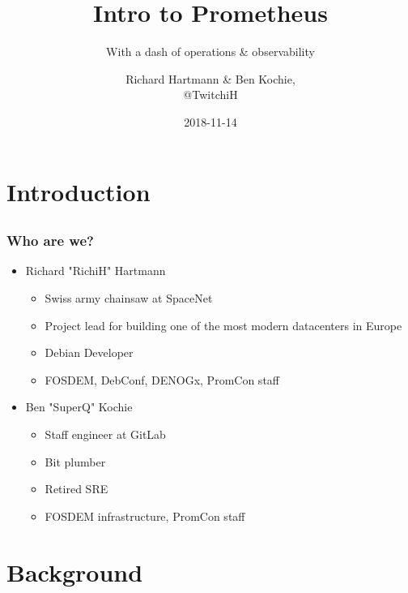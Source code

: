 \documentclass[t]{beamer}
\title{Intro to Prometheus}
\subtitle{With a dash of operations \& observability}
\author{Richard Hartmann \& Ben Kochie,\\
@TwitchiH}
\date{2018-11-14}
\begin{document}
\section{Introduction}

\subsection{}

\begin{frame}
	\titlepage
\end{frame}

\begin{frame}
	\frametitle{Who are we?}
	\begin{itemize}
		\item Richard "RichiH" Hartmann
		\begin{itemize}
			\item Swiss army chainsaw at SpaceNet
			\item Project lead for building one of the most modern datacenters in Europe
			\item Debian Developer
			\item FOSDEM, DebConf, DENOGx, PromCon staff
		\end{itemize}
		\item Ben "SuperQ" Kochie
		\begin{itemize}
			\item Staff engineer at GitLab
			\item Bit plumber
			\item Retired SRE
			\item FOSDEM infrastructure, PromCon staff
		\end{itemize}
	\end{itemize}
\end{frame}

\subsection{}



\section{Background}


\subsection{}

\end{document}
